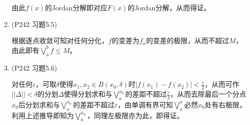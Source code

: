 \documentclass[a4paper,UTF8,fontset=windows]{ctexart}
\begin{document}
\begin{enumerate}
    由此$f(x)$的Jordan分解即对应$F(x)$的Jordan分解，从而得证。
    
    \item (P242 习题5.5)
    
    根据逐点收敛可知对任何分化，$f$的变差为$f_n$的变差的极限，从而不超过$M$，由此即有$\bigvee_a^bf\le M$。
    
    \item (P242 习题5.6)
    
    对任何$\varepsilon$，可取$\delta$使得$x_1,x_2\in B(x_0,\delta)$时$|f(x_1)-f(x_2)|<\frac{\varepsilon}{2}$，从而可作$||\Delta||<\delta$的分划$\Delta$使得分划求和与$\bigvee_a^{x_0}$的差距不超过$\frac{\varepsilon}{2}$，从而去除最后一个分点$x_0$后分划求和与$\bigvee_a^{x_0}$的差距不超过$\varepsilon$，由单调有界可知$\bigvee_a^x$必然$x_0$处有右极限，利用上述推导即知为$\bigvee_a^{x_0}$，同理左极限亦为此，即得证。
\end{enumerate}
\end{document}
